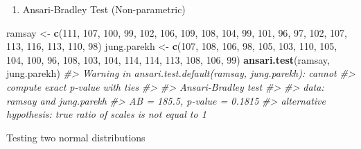 \documentclass[
]{book}
\newenvironment{Shaded}{\begin{snugshade}}{\end{snugshade}}
\newcommand{\CommentTok}[1]{\textcolor[rgb]{0.56,0.35,0.01}{\textit{#1}}}
\newcommand{\DecValTok}[1]{\textcolor[rgb]{0.00,0.00,0.81}{#1}}
\newcommand{\FunctionTok}[1]{\textcolor[rgb]{0.13,0.29,0.53}{\textbf{#1}}}
\newcommand{\NormalTok}[1]{#1}
\newcommand{\OtherTok}[1]{\textcolor[rgb]{0.56,0.35,0.01}{#1}}
\providecommand{\tightlist}{%
  \setlength{\itemsep}{0pt}\setlength{\parskip}{0pt}}
\begin{document}
\begin{enumerate}
\def\labelenumi{\alph{enumi}.}
\setcounter{enumi}{4}
\tightlist
\item
  Ansari-Bradley Test (Non-parametric)
\end{enumerate}

\begin{Shaded}
\begin{Highlighting}[]
\NormalTok{ramsay }\OtherTok{\textless{}{-}} \FunctionTok{c}\NormalTok{(}\DecValTok{111}\NormalTok{, }\DecValTok{107}\NormalTok{, }\DecValTok{100}\NormalTok{, }\DecValTok{99}\NormalTok{, }\DecValTok{102}\NormalTok{, }\DecValTok{106}\NormalTok{, }\DecValTok{109}\NormalTok{, }\DecValTok{108}\NormalTok{, }\DecValTok{104}\NormalTok{, }\DecValTok{99}\NormalTok{,}
            \DecValTok{101}\NormalTok{, }\DecValTok{96}\NormalTok{, }\DecValTok{97}\NormalTok{, }\DecValTok{102}\NormalTok{, }\DecValTok{107}\NormalTok{, }\DecValTok{113}\NormalTok{, }\DecValTok{116}\NormalTok{, }\DecValTok{113}\NormalTok{, }\DecValTok{110}\NormalTok{, }\DecValTok{98}\NormalTok{)}
\NormalTok{jung.parekh }\OtherTok{\textless{}{-}} \FunctionTok{c}\NormalTok{(}\DecValTok{107}\NormalTok{, }\DecValTok{108}\NormalTok{, }\DecValTok{106}\NormalTok{, }\DecValTok{98}\NormalTok{, }\DecValTok{105}\NormalTok{, }\DecValTok{103}\NormalTok{, }\DecValTok{110}\NormalTok{, }\DecValTok{105}\NormalTok{, }\DecValTok{104}\NormalTok{,}
            \DecValTok{100}\NormalTok{, }\DecValTok{96}\NormalTok{, }\DecValTok{108}\NormalTok{, }\DecValTok{103}\NormalTok{, }\DecValTok{104}\NormalTok{, }\DecValTok{114}\NormalTok{, }\DecValTok{114}\NormalTok{, }\DecValTok{113}\NormalTok{, }\DecValTok{108}\NormalTok{, }\DecValTok{106}\NormalTok{, }\DecValTok{99}\NormalTok{)}
\FunctionTok{ansari.test}\NormalTok{(ramsay, jung.parekh)}
\CommentTok{\#\textgreater{} Warning in ansari.test.default(ramsay, jung.parekh): cannot}
\CommentTok{\#\textgreater{} compute exact p{-}value with ties}
\CommentTok{\#\textgreater{} }
\CommentTok{\#\textgreater{}  Ansari{-}Bradley test}
\CommentTok{\#\textgreater{} }
\CommentTok{\#\textgreater{} data:  ramsay and jung.parekh}
\CommentTok{\#\textgreater{} AB = 185.5, p{-}value = 0.1815}
\CommentTok{\#\textgreater{} alternative hypothesis: true ratio of scales is not equal to 1}
\end{Highlighting}
\end{Shaded}

Testing two normal distributions
\end{document}
